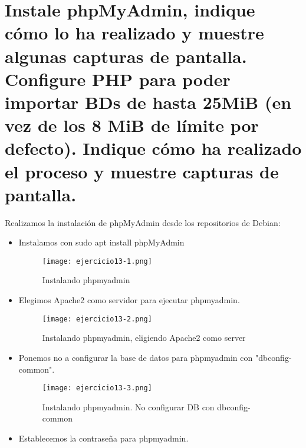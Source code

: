 	\section{Instale phpMyAdmin, indique cómo lo ha realizado y muestre algunas capturas de pantalla. Configure PHP para poder importar BDs de hasta 25MiB (en vez de los 8 MiB de límite por defecto). Indique cómo ha realizado el proceso y muestre capturas de pantalla.}
	
	
	Realizamos la instalación de phpMyAdmin desde los repositorios de Debian\cite{ejercicio13-1}:
	
	\begin{itemize}
		\item Instalamos con sudo apt install phpMyAdmin
			\begin{figure}[H]	
				\centering
				\texttt{[image: ejercicio13-1.png]} 
				\label{figura91} 
				\caption{Instalando phpmyadmin}
			\end{figure}
		\item Elegimos Apache2 como servidor para ejecutar phpmyadmin.
			\begin{figure}[H]	
				\centering
				\texttt{[image: ejercicio13-2.png]} 
				\label{figura92} 
				\caption{Instalando phpmyadmin, eligiendo Apache2 como server}
			\end{figure}
		\item Ponemos no a configurar la base de datos para phpmyadmin con "dbconfig-common".
			\begin{figure}[H]	
				\centering
				\texttt{[image: ejercicio13-3.png]} 
				\label{figura93} 
				\caption{Instalando phpmyadmin. No configurar DB con dbconfig-common}
			\end{figure}
		\item Establecemos la contraseña para phpmyadmin.
	\end{itemize}
	
